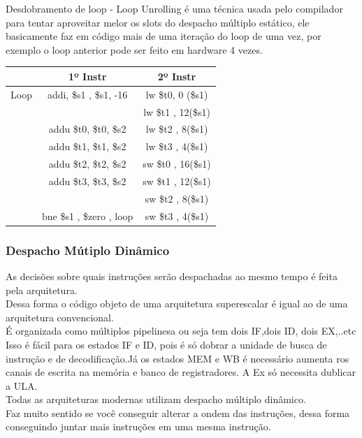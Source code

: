 \documentclass[a4paper]{article}
\begin{document}
    Desdobramento de loop - Loop Unrolling é uma técnica usada pelo compilador para tentar aproveitar melor os slots do
    despacho múltiplo estático, ele basicamente faz em código mais de uma iteração do loop de uma vez, por exemplo o
    loop anterior pode ser feito em hardware 4 vezes.

\begin{table}[h]
    \begin{center}
        \begin{tabular}{||c|c|c||}
            \hline
            & \textbf{1º Instr} & \textbf{2º Instr}\\
            \hline
            Loop & addi, \$s1 , \$s1, -16 & lw \$t0, 0 (\$s1)\\
                 &                        & lw \$t1 , 12(\$s1)\\
                 & addu \$t0, \$t0, \$s2  & lw \$t2 , 8(\$s1)\\
                 & addu \$t1, \$t1, \$s2  & lw \$t3 , 4(\$s1)\\
                 & addu \$t2, \$t2, \$s2  & sw \$t0 , 16(\$s1)\\
                 & addu \$t3, \$t3, \$s2  & sw \$t1 , 12(\$s1)\\
                 &                        & sw \$t2 , 8(\$s1)\\
                 & bne \$s1 , \$zero , loop & sw \$t3 , 4(\$s1)\\
            \hline

        \end{tabular}
    \end{center}
\end{table}

\subsubsection{Despacho Mútiplo Dinâmico}
    As decisões sobre quais instruções serão despachadas ao mesmo tempo é feita pela arquitetura.\\
    Dessa forma o código objeto de uma arquitetura superescalar é igual ao de uma arquitetura convencional.\\
    É organizada como múltiplos pipelinesa ou seja tem dois IF,dois ID, dois EX,..etc\\
    Isso é fácil para os estados IF e ID, pois é só dobrar a unidade de busca de instrução e de decodificação.Já os
    estados MEM e WB é necessário aumenta ros canais de escrita na memória e banco de registradores. A Ex só necessita
    dublicar a ULA.\\
    Todas as arquiteturas modernas utilizam despacho múltiplo dinâmico.\\
    Faz muito sentido se você conseguir alterar a ondem das instruções, dessa forma conseguindo juntar mais instruções
    em uma mesma instrução.\\
\end{document}
